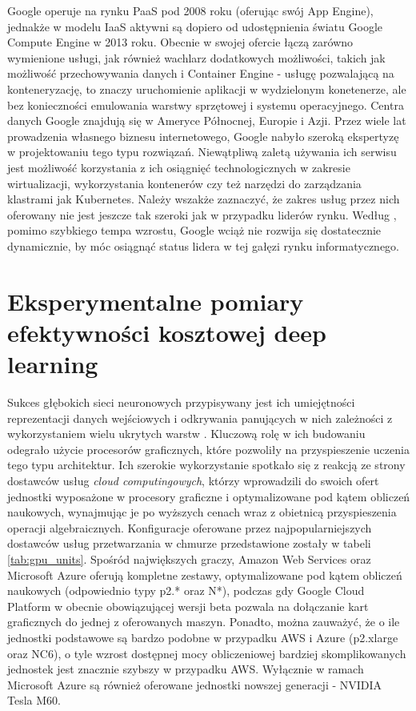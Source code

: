 \documentclass[12pt,a4paper,twoside]{article}
\begin{document}
Google operuje na rynku PaaS pod 2008 roku (oferując swój App Engine), jednakże w modelu IaaS aktywni są dopiero od udostępnienia światu Google Compute Engine w 2013 roku. Obecnie w swojej ofercie łączą zarówno wymienione usługi, jak również wachlarz dodatkowych możliwości, takich jak możliwość przechowywania danych i Container Engine - usługę pozwalającą na konteneryzację, to znaczy uruchomienie aplikacji w wydzielonym konetenerze, ale bez konieczności emulowania warstwy sprzętowej i systemu operacyjnego. Centra danych Google znajdują się w Ameryce Północnej, Europie i Azji. Przez wiele lat prowadzenia własnego biznesu internetowego, Google nabyło szeroką ekspertyzę w projektowaniu tego typu rozwiązań. Niewątpliwą zaletą używania ich serwisu jest możliwość korzystania z ich osiągnięć technologicznych w zakresie wirtualizacji, wykorzystania kontenerów czy też narzędzi do zarządzania klastrami jak Kubernetes. Należy wszakże zaznaczyć, że zakres usług przez nich oferowany nie jest jeszcze tak szeroki jak w przypadku liderów rynku. Według \citet{leong2017}, pomimo szybkiego tempa wzrostu, Google wciąż nie rozwija się dostatecznie dynamicznie, by móc osiągnąć status lidera w tej gałęzi rynku informatycznego.

\clearpage

\section{Eksperymentalne pomiary efektywności kosztowej deep learning}

\noindent
Sukces głębokich sieci neuronowych przypisywany jest ich umiejętności reprezentacji danych wejściowych i odkrywania panujących w nich zależności z wykorzystaniem wielu ukrytych warstw \citep{lecun2015}. Kluczową rolę w ich budowaniu odegrało użycie procesorów graficznych, które pozwoliły na przyspieszenie uczenia tego typu architektur. Ich szerokie wykorzystanie spotkało się z reakcją ze strony dostawców usług \textit{cloud computingowych}, którzy wprowadzili do swoich ofert jednostki wyposażone w procesory graficzne i optymalizowane pod kątem obliczeń naukowych, wynajmując je po wyższych cenach wraz z obietnicą przyspieszenia operacji algebraicznych. Konfiguracje oferowane przez najpopularniejszych dostawców usług przetwarzania w chmurze przedstawione zostały w tabeli \ref{tab:gpu_units}. Spośród największych graczy, Amazon Web Services oraz Microsoft Azure oferują kompletne zestawy, optymalizowane pod kątem obliczeń naukowych (odpowiednio typy p2.* oraz N*), podczas gdy Google Cloud Platform w obecnie obowiązującej wersji beta pozwala na dołączanie kart graficznych do jednej z oferowanych maszyn. Ponadto, można zauważyć, że o ile jednostki podstawowe są bardzo podobne w przypadku AWS i Azure (p2.xlarge oraz NC6), o tyle wzrost dostępnej mocy obliczeniowej bardziej skomplikowanych jednostek jest znacznie szybszy w przypadku AWS. Wyłącznie w ramach Microsoft Azure są również oferowane jednostki nowszej generacji - NVIDIA Tesla M60.
\end{document}

